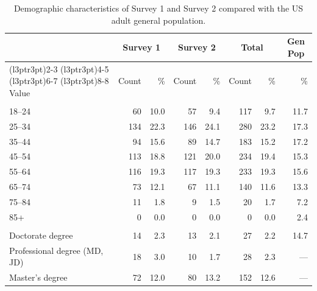 \begin{table}[!h]
\centering
\caption{\label{tab:combined_demo}Demographic characteristics of Survey 1 and Survey 2 compared with the US adult general population.}
\centering
\fontsize{8}{10}\selectfont
\begin{threeparttable}
\begin{tabular}[t]{lrrrrrrr}
\toprule
\multicolumn{1}{c}{\textbf{ }} & \multicolumn{2}{c}{\textbf{Survey 1}} & \multicolumn{2}{c}{\textbf{Survey 2}} & \multicolumn{2}{c}{\textbf{Total}} & \multicolumn{1}{c}{\textbf{Gen Pop}} \\
\cmidrule(l{3pt}r{3pt}){2-3} \cmidrule(l{3pt}r{3pt}){4-5} \cmidrule(l{3pt}r{3pt}){6-7} \cmidrule(l{3pt}r{3pt}){8-8}
Value & Count & \% & Count & \% & Count & \% & \%\\
\midrule
\addlinespace[0.3em]
\multicolumn{8}{l}{\textbf{Age Range}}\\
\hspace{1em}18--24 & 60 & 10.0 & 57 & 9.4 & 117 & 9.7 & 11.7\\
\hspace{1em}25--34 & 134 & 22.3 & 146 & 24.1 & 280 & 23.2 & 17.3\\
\hspace{1em}35--44 & 94 & 15.6 & 89 & 14.7 & 183 & 15.2 & 17.2\\
\hspace{1em}45--54 & 113 & 18.8 & 121 & 20.0 & 234 & 19.4 & 15.3\\
\hspace{1em}55--64 & 116 & 19.3 & 117 & 19.3 & 233 & 19.3 & 15.6\\
\hspace{1em}65--74 & 73 & 12.1 & 67 & 11.1 & 140 & 11.6 & 13.3\\
\hspace{1em}75--84 & 11 & 1.8 & 9 & 1.5 & 20 & 1.7 & 7.2\\
\hspace{1em}85+ & 0 & 0.0 & 0 & 0.0 & 0 & 0.0 & 2.4\\
\addlinespace[0.3em]
\multicolumn{8}{l}{\textbf{Education}}\\
\hspace{1em}Doctorate degree & 14 & 2.3 & 13 & 2.1 & 27 & 2.2 & 14.7\\
\hspace{1em}Professional degree (MD, JD) & 18 & 3.0 & 10 & 1.7 & 28 & 2.3 & ---\\
\hspace{1em}Master's degree & 72 & 12.0 & 80 & 13.2 & 152 & 12.6 & ---\\

\end{tabular}
\end{threeparttable}
\end{table}
